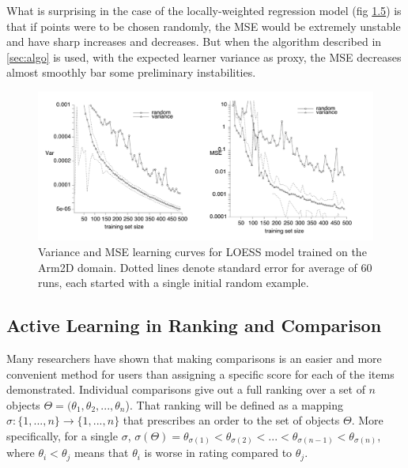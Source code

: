 \documentclass[
  letterpaper,
  DIV=11,
  numbers=noendperiod,
  oneside]{scrreprt}
\theoremstyle{remark}
\begin{document}
What is surprising in the case of the locally-weighted regression model
(fig \hyperref[fig:empirical:regress]{1.5}) is that if points were to be
chosen randomly, the MSE would be extremely unstable and have sharp
increases and decreases. But when the algorithm described in
\hyperref[sec:algo]{{[}sec:algo{]}} is used, with the expected learner
variance as proxy, the MSE decreases almost smoothly bar some
preliminary instabilities.

\begin{figure}

{\centering \includegraphics[width=1\textwidth,height=\textheight]{Figures/1_experiment_results_regression.png}

}

\caption{Variance and MSE learning curves for LOESS model trained on the
Arm2D domain. Dotted lines denote standard error for average of 60 runs,
each started with a single initial random example.}

\end{figure}%

\subsection{Active Learning in Ranking and
Comparison}\label{active-learning-in-ranking-and-comparison}

Many researchers have shown that making comparisons is an easier and
more convenient method for users than assigning a specific score for
each of the items demonstrated. Individual comparisons give out a full
ranking over a set of \(n\) objects
\(\Theta = (\theta_1, \theta_2, ..., \theta_n\)). That ranking will be
defined as a mapping \(\sigma : \{1,...,n\} \rightarrow \{1,...,n\}\)
that prescribes an order to the set of objects \(\Theta\). More
specifically, for a single \(\sigma\),
\(\sigma(\Theta) = \theta_{\sigma(1)} < \theta_{\sigma(2)} < ... < \theta_{\sigma(n-1)} < \theta_{\sigma(n)}\),
where \(\theta_{i} < \theta_{j}\) means that \(\theta_{i}\) is worse in
rating compared to \(\theta_{j}\).
\end{document}
